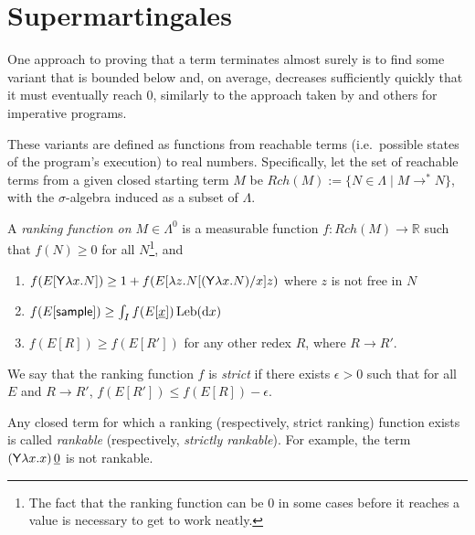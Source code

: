 \section{Supermartingales}
\label{sec:supermartingales}

One approach to proving that a term terminates almost surely is to find some variant that is bounded below and, on average, decreases sufficiently quickly that it must eventually reach 0, similarly to the approach taken by 
\cite{DBLP:conf/popl/FioritiH15} and others for imperative programs.

These variants are defined as functions from reachable terms (i.e.~possible states of the program's execution) to real numbers. Specifically, let the set of reachable terms from a given closed starting term $M$ be $Rch(M) := \{N \in \Lambda \mid M \to^* N \}$, with the $\sigma$-algebra induced as a subset of $\Lambda$.

\begin{definition}\rm
\label{def:ranking function}
A \emph{ranking function on $M \in \Lambda^0$} is a measurable function $f:\mathit{Rch}(M) \to \mathbb{R}$ such that $f(N) \geq 0$ for all $N$\footnote{The fact that the ranking function can be 0 in some cases before it reaches a value is necessary to get  to work neatly.}, and
\begin{enumerate}
    \item $f(E[\mathsf{Y} \lambda x. N]) \geq 1+ f(E[\lambda z. N[(\mathsf{Y} \lambda x. N)/x] z)$ where $z$ is not free in $N$
    \item $f(E[\mathsf{sample}]) \geq \int_I f(E[\underline{x}]) \, \mathrm{Leb}(\mathrm{d}x)$
    \item $f(E[R]) \geq f(E[R'])$ for any other redex $R$, where $R \to R'$.
\end{enumerate}
\iffalse
\lo{@Andrew: As defined, ranking function $f$ is not required to satisfy: $f(N) = 0$ iff $N$ is a value. But for AST analysis, we always require $f$ to satisfy this property. It seems cleaner to include this in the definition.} 
\akr{The fact that the ranking function can be 0 in some cases before it reaches a value is necessary to get \Cref{thm:minimal} to work neatly.}
\lo{OK. Let's leave \Cref{def:ranking function} as it is.}
\fi
We say that the ranking function $f$ is \emph{strict} if there exists $\epsilon > 0$ such that for all $E$ and $R \to R'$, $f(E[R']) \leq f(E[R]) - \epsilon$.

Any closed term for which a ranking (respectively, strict ranking) function exists is called \emph{rankable} (respectively, \emph{strictly rankable}). 
For example, the term $(\mathsf{Y} \lambda x.x) \, \underline 0$ is not rankable.
\end{definition}

